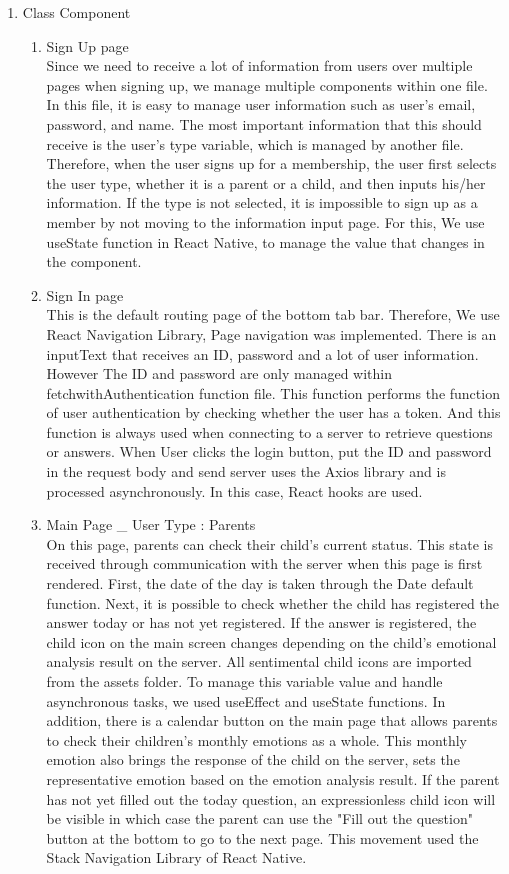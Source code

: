 \documentclass[conference]{IEEEtran}
\begin{document}
\begin{enumerate}
\begin{enumerate}
           \item Class Component
           \begin{enumerate}
               \item Sign Up page
               \\Since we need to receive a lot of information from users over multiple pages when signing up, we manage multiple components within one file. In this file, it is easy to manage user information such as user's email, password, and name. The most important information that this should receive is the user's type variable, which is managed by another file. Therefore, when the user signs up for a membership, the user first selects the user type, whether it is a parent or a child, and then inputs his/her information. If the type is not selected, it is impossible to sign up as a member by not moving to the information input page. For this, We use useState function in React Native, to manage the value that changes in the component.
               \item Sign In page
               \\This is the default routing page of the bottom tab bar. Therefore, We use React Navigation Library, Page navigation was implemented. There is an inputText that receives an ID, password and a lot of user information. However The ID and password are only managed within fetchwithAuthentication function file. This function performs the function of user authentication by checking whether the user has a token. And this function is always used when connecting to a server to retrieve questions or answers. When User clicks the login button, put the ID and password in the request body and send server uses the Axios library and is processed asynchronously. In this case, React hooks are used.
               \item Main Page \_ User Type : Parents
               \\On this page, parents can check their child's current status. This state is received through communication with the server when this page is first rendered. First, the date of the day is taken through the Date default function. Next, it is possible to check whether the child has registered the answer today or has not yet registered. If the answer is registered, the child icon on the main screen changes depending on the child's emotional analysis result on the server. All sentimental child icons are imported from the assets folder. To manage this variable value and handle asynchronous tasks, we used useEffect and useState functions. In addition, there is a calendar button on the main page that allows parents to check their children's monthly emotions as a whole. This monthly emotion also brings the response of the child on the server, sets the representative emotion based on the emotion analysis result. If the parent has not yet filled out the today question, an expressionless child icon will be visible in which case the parent can use the "Fill out the question" button at the bottom to go to the next page. This movement used the Stack Navigation Library of React Native.

\end{enumerate}
\end{enumerate}
\end{enumerate}
\end{document}
